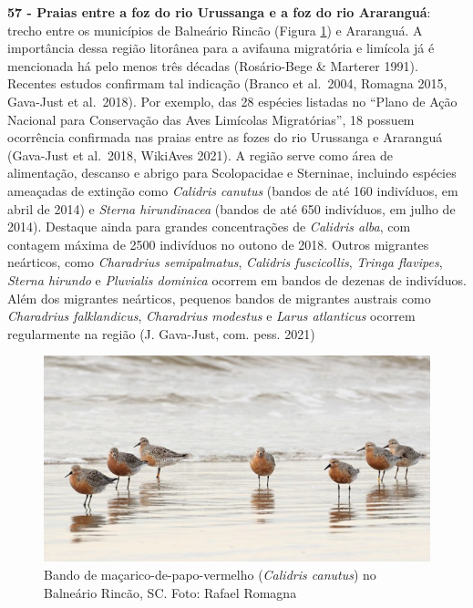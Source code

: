 \documentclass[
  oneside]{scrbook}
\begin{document}
\textbf{57 - Praias entre a foz do rio Urussanga e a foz do rio Araranguá}: trecho entre os municípios de Balneário Rincão (Figura \ref{fig:28}) e Araranguá. A importância dessa região litorânea para a avifauna migratória e limícola já é mencionada há pelo menos três décadas (Rosário-Bege \& Marterer 1991). Recentes estudos confirmam tal indicação (Branco et al.~2004, Romagna 2015, Gava-Just et al.~2018). Por exemplo, das 28 espécies listadas no ``Plano de Ação Nacional para Conservação das Aves Limícolas Migratórias'', 18 possuem ocorrência confirmada nas praias entre as fozes do rio Urussanga e Araranguá (Gava-Just et al.~2018, WikiAves 2021). A região serve como área de alimentação, descanso e abrigo para Scolopacidae e Sterninae, incluindo espécies ameaçadas de extinção como \emph{Calidris canutus} (bandos de até 160 indivíduos, em abril de 2014) e \emph{Sterna hirundinacea} (bandos de até 650 indivíduos, em julho de 2014). Destaque ainda para grandes concentrações de \emph{Calidris alba}, com contagem máxima de 2500 indivíduos no outono de 2018. Outros migrantes neárticos, como \emph{Charadrius semipalmatus}, \emph{Calidris fuscicollis}, \emph{Tringa flavipes}, \emph{Sterna hirundo} e \emph{Pluvialis dominica} ocorrem em bandos de dezenas de indivíduos. Além dos migrantes neárticos, pequenos bandos de migrantes austrais como \emph{Charadrius falklandicus}, \emph{Charadrius modestus} e \emph{Larus atlanticus} ocorrem regularmente na região (J. Gava-Just, com. pess. 2021)\\

\begin{figure}[H]

{\centering \includegraphics[width=0.75\linewidth]{imagens/cap07/Figura_7.8} 

}

\caption{Bando de maçarico-de-papo-vermelho (\emph{Calidris canutus}) no Balneário Rincão, SC. Foto: Rafael Romagna}\label{fig:28}
\end{figure}
\end{document}

